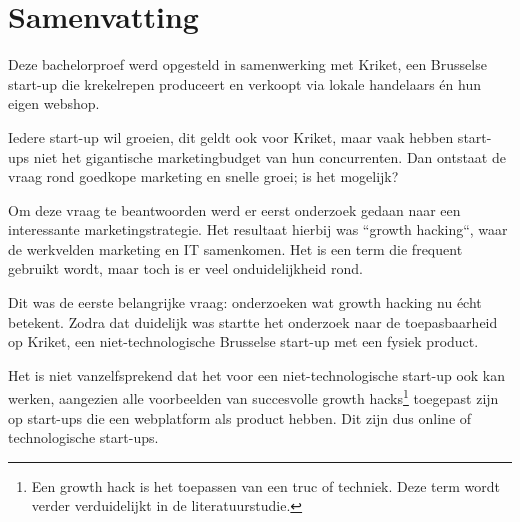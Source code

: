 
%
%


\chapter*{Samenvatting}

Deze bachelorproef werd opgesteld in samenwerking met Kriket, een Brusselse start-up die krekelrepen produceert en verkoopt via lokale handelaars én hun eigen webshop. 

Iedere start-up wil groeien, dit geldt ook voor Kriket, maar vaak hebben start-ups niet het gigantische marketingbudget van hun concurrenten. Dan ontstaat de vraag rond goedkope marketing en snelle groei; is het mogelijk?

Om deze vraag te beantwoorden werd er eerst onderzoek gedaan naar een interessante marketingstrategie. Het resultaat hierbij was ``growth hacking``, waar de werkvelden marketing en IT samenkomen. Het is een term die frequent gebruikt wordt, maar toch is er veel onduidelijkheid rond.

Dit was de eerste belangrijke vraag: onderzoeken wat growth hacking nu écht betekent. Zodra dat duidelijk was startte het onderzoek naar de toepasbaarheid op Kriket, een niet-technologische Brusselse start-up met een fysiek product. 

Het is niet vanzelfsprekend dat het voor een niet-technologische start-up ook kan werken, aangezien alle voorbeelden van succesvolle growth hacks\footnote{Een growth hack is het toepassen van een truc of techniek. Deze term wordt verder verduidelijkt in de literatuurstudie.} toegepast zijn op start-ups die een webplatform als product hebben. Dit zijn dus online of technologische start-ups.

